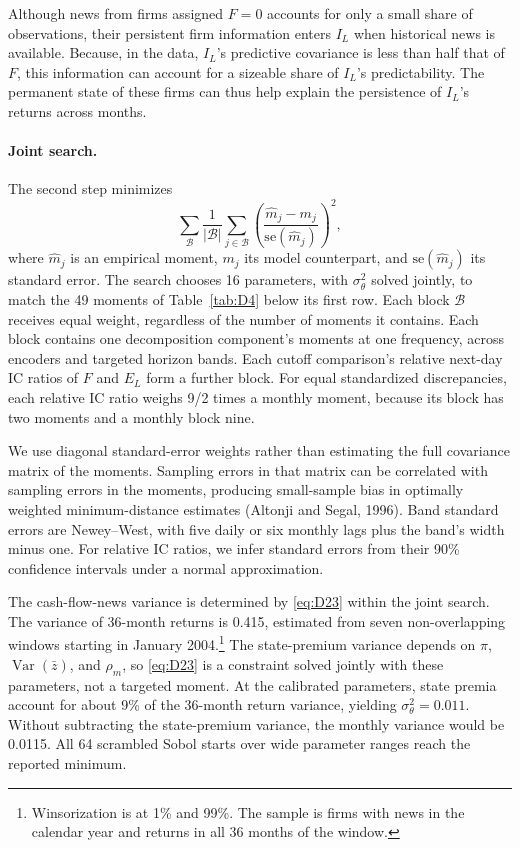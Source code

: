 \documentclass[11pt,letterpaper]{article}
\theoremstyle{remark}
\DeclareMathOperator{\Var}{Var}
\begin{document}
Although news from firms assigned $F=0$ accounts for only a small share of observations, their persistent firm information enters $I_L$ when historical news is available. Because, in the data, $I_L$'s predictive covariance is less than half that of $F$, this information can account for a sizeable share of $I_L$'s predictability. The permanent state of these firms can thus help explain the persistence of $I_L$'s returns across months.

\paragraph{Joint search.}
The second step minimizes
\[
\sum_{\mathcal B}\frac{1}{|\mathcal B|}\sum_{j\in\mathcal B}
\left(\frac{\hat m_j-m_j}{\mathrm{se}(\hat m_j)}\right)^2,
\]
where $\hat m_j$ is an empirical moment, $m_j$ its model counterpart, and $\mathrm{se}(\hat m_j)$ its standard error. The search chooses 16 parameters, with $\sigma_\theta^2$ solved jointly, to match the 49 moments of Table~\ref{tab:D4} below its first row. Each block $\mathcal B$ receives equal weight, regardless of the number of moments it contains. Each block contains one decomposition component's moments at one frequency, across encoders and targeted horizon bands. Each cutoff comparison's relative next-day IC ratios of $F$ and $E_L$ form a further block. For equal standardized discrepancies, each relative IC ratio weighs 9/2 times a monthly moment, because its block has two moments and a monthly block nine.

We use diagonal standard-error weights rather than estimating the full covariance matrix of the moments. Sampling errors in that matrix can be correlated with sampling errors in the moments, producing small-sample bias in optimally weighted minimum-distance estimates (Altonji and Segal, 1996). Band standard errors are Newey--West, with five daily or six monthly lags plus the band's width minus one. For relative IC ratios, we infer standard errors from their 90\% confidence intervals under a normal approximation.

The cash-flow-news variance is determined by \eqref{eq:D23} within the joint search. The variance of 36-month returns is 0.415, estimated from seven non-overlapping windows starting in January 2004.\footnote{Winsorization is at 1\% and 99\%. The sample is firms with news in the calendar year and returns in all 36 months of the window.}
The state-premium variance depends on $\pi$, $\Var(\bar z)$, and $\rho_m$, so \eqref{eq:D23} is a constraint solved jointly with these parameters, not a targeted moment. At the calibrated parameters, state premia account for about 9\% of the 36-month return variance, yielding $\sigma_\theta^2=0.011$. Without subtracting the state-premium variance, the monthly variance would be 0.0115. All 64 scrambled Sobol starts over wide parameter ranges reach the reported minimum.
\end{document}
